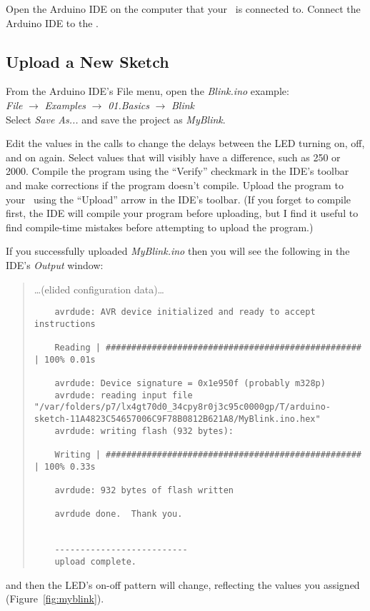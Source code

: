     Open the Arduino IDE on the computer that your \developmentboard\ is connected to.
    Connect the Arduino IDE to the \developmentboard.
    

\subsection{Upload a New Sketch}

    From the Arduino IDE's File menu, open the \textit{Blink.ino} example: \\
    \textit{File} $\rightarrow$ \textit{Examples} $\rightarrow$ \textit{01.Basics} $\rightarrow$ \textit{Blink} \\
    Select \textit{Save As...} and save the project as \textit{MyBlink}.

    Edit the values in the  calls to change the delays between the LED turning on, off, and on again.
    Select values that will visibly have a difference, such as 250 or 2000.
    Compile the program using the ``Verify'' checkmark in the IDE's toolbar and make corrections if the program doesn't compile.
    Upload the program to your \developmentboard\ using the ``Upload'' arrow in the IDE's toolbar.
    (If you forget to compile first, the IDE will compile your program before uploading, but I find it useful to find compile-time mistakes before attempting to upload the program.)

    If you successfully uploaded \textit{MyBlink.ino} then you will see the following in the IDE's \textit{Output} window:
    \begin{quote}
    \dots (elided configuration data)\dots
    \begin{verbatim}
    avrdude: AVR device initialized and ready to accept instructions

    Reading | ################################################## | 100% 0.01s

    avrdude: Device signature = 0x1e950f (probably m328p)
    avrdude: reading input file "/var/folders/p7/lx4gt70d0_34cpy8r0j3c95c0000gp/T/arduino-sketch-11A4823C54657006C9F78B0812B621A8/MyBlink.ino.hex"
    avrdude: writing flash (932 bytes):

    Writing | ################################################## | 100% 0.33s

    avrdude: 932 bytes of flash written

    avrdude done.  Thank you.


    --------------------------
    upload complete.
    \end{verbatim}\end{quote}
    and then the LED's on-off pattern will change, reflecting the  values you assigned (Figure~\ref{fig:myblink}).

